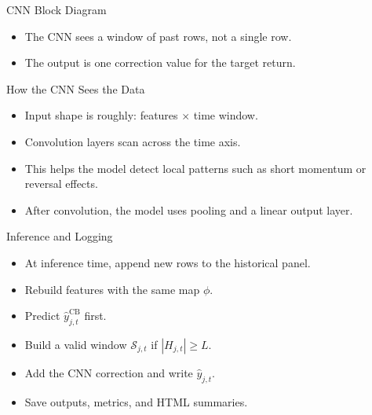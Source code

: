 \documentclass[aspectratio=169]{beamer}
\newcommand{\seq}{\mathcal{S}}
\begin{document}
\begin{frame}{CNN Block Diagram}
  \centering

  \vspace{0.4em}
  \begin{itemize}
    \item The CNN sees a window of past rows, not a single row.
    \item The output is one correction value for the target return.
  \end{itemize}
\end{frame}

\begin{frame}{How the CNN Sees the Data}
  \begin{itemize}
    \item Input shape is roughly: features \(\times\) time window.
    \item Convolution layers scan across the time axis.
    \item This helps the model detect local patterns such as short momentum or reversal effects.
    \item After convolution, the model uses pooling and a linear output layer.
  \end{itemize}
\end{frame}

\begin{frame}{Inference and Logging}
  \begin{itemize}
    \item At inference time, append new rows to the historical panel.
    \item Rebuild features with the same map $\phi$.
    \item Predict $\hat y^{\mathrm{CB}}_{j,t}$ first.
    \item Build a valid window $\seq_{j,t}$ if $|H_{j,t}| \ge L$.
    \item Add the CNN correction and write $\hat y_{j,t}$.
    \item Save outputs, metrics, and HTML summaries.
  \end{itemize}
\end{frame}
\end{document}
